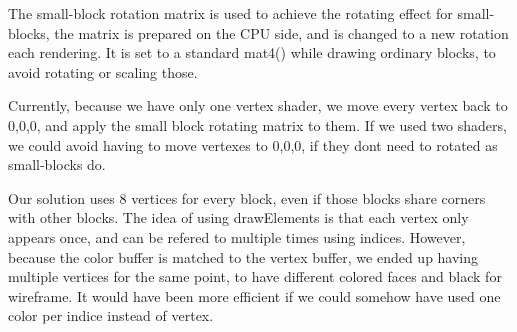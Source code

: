 The small-block rotation matrix is used to achieve the rotating effect for small-blocks, 
the matrix is prepared on the CPU side, and is changed to a new rotation each rendering.
It is set to a standard mat4() while drawing ordinary blocks, to avoid rotating or scaling those.

Currently, because we have only one vertex shader, we move every vertex back to 0,0,0, and apply the small block rotating matrix to them.
If we used two shaders, we could avoid having to move vertexes to 0,0,0, if they dont need to rotated as small-blocks do.

Our solution uses 8 vertices for every block, even if those blocks share corners with other blocks.
The idea of using drawElements is that each vertex only appears once, 
and can be refered to multiple times using indices.
However, because the color buffer is matched to the vertex buffer, 
we ended up having multiple vertices for the same point, 
to have different colored faces and black for wireframe.
It would have been more efficient if we could somehow have used one color per indice instead of vertex.
